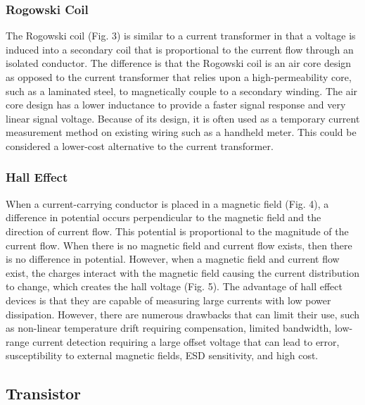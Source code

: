 \documentclass[12pt,a4paper,titlepage,openany]{report}
\begin{document}
\subsubsection{Rogowski Coil}
The Rogowski coil (Fig. 3) is similar to a current transformer in that a voltage is induced into a secondary coil that is proportional
to the current flow through an isolated conductor. The difference is that the Rogowski coil is an air core design as opposed to
the current transformer that relies upon a high-permeability core, such as a laminated steel, to magnetically couple to a
secondary winding. The air core design has a lower inductance to provide a faster signal response and very linear signal voltage.
Because of its design, it is often used as a temporary current measurement method on existing wiring such as a handheld meter.
This could be considered a lower-cost alternative to the current transformer.

\subsubsection{Hall Effect}
When a current-carrying conductor is placed in a magnetic field (Fig. 4), a difference in potential occurs perpendicular to the
magnetic field and the direction of current flow. This potential is proportional to the magnitude of the current flow. When there
is no magnetic field and current flow exists, then there is no difference in potential. However, when a magnetic field and current
flow exist, the charges interact with the magnetic field causing the current distribution to change, which creates the hall voltage
(Fig. 5).
The advantage of hall effect devices is that they are capable of measuring large currents with low power dissipation. However,
there are numerous drawbacks that can limit their use, such as non-linear temperature drift requiring compensation, limited
bandwidth, low-range current detection requiring a large offset voltage that can lead to error, susceptibility to external magnetic
fields, ESD sensitivity, and high cost.

\subsection{Transistor}
\end{document}
